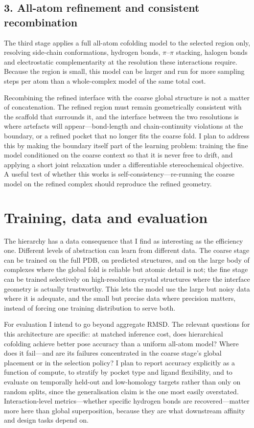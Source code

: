 \documentclass[11pt]{article}
\begin{document}
\subsection*{3. All-atom refinement and consistent recombination}

The third stage applies a full all-atom cofolding model to the selected region only, resolving
side-chain conformations, hydrogen bonds, $\pi$--$\pi$ stacking, halogen bonds and electrostatic
complementarity at the resolution these interactions require. Because the region is small, this
model can be larger and run for more sampling steps per atom than a whole-complex model of the same
total cost.

Recombining the refined interface with the coarse global structure is not a matter of concatenation.
The refined region must remain geometrically consistent with the scaffold that surrounds it, and
the interface between the two resolutions is where artefacts will appear---bond-length and
chain-continuity violations at the boundary, or a refined pocket that no longer fits the coarse
fold. I plan to address this by making the boundary itself part of the learning problem: training
the fine model conditioned on the coarse context so that it is never free to drift, and applying a
short joint relaxation under a differentiable stereochemical objective. A useful test of whether
this works is self-consistency---re-running the coarse model on the refined complex should reproduce
the refined geometry.

\section*{Training, data and evaluation}

The hierarchy has a data consequence that I find as interesting as the efficiency one. Different
levels of abstraction can learn from different data. The coarse stage can be trained on the full
PDB, on predicted structures, and on the large body of complexes where the global fold is reliable
but atomic detail is not; the fine stage can be trained selectively on high-resolution crystal
structures where the interface geometry is actually trustworthy. This lets the model use the large
but noisy data where it is adequate, and the small but precise data where precision matters,
instead of forcing one training distribution to serve both.

For evaluation I intend to go beyond aggregate RMSD. The relevant questions for this architecture
are specific: at matched inference cost, does hierarchical cofolding achieve better pose accuracy
than a uniform all-atom model? Where does it fail---and are its failures concentrated in the coarse
stage's global placement or in the selection policy? I plan to report accuracy explicitly as a
function of compute, to stratify by pocket type and ligand flexibility, and to evaluate on
temporally held-out and low-homology targets rather than only on random splits, since the
generalisation claim is the one most easily overstated. Interaction-level metrics---whether specific
hydrogen bonds are recovered---matter more here than global superposition, because they are what
downstream affinity and design tasks depend on.
\end{document}
